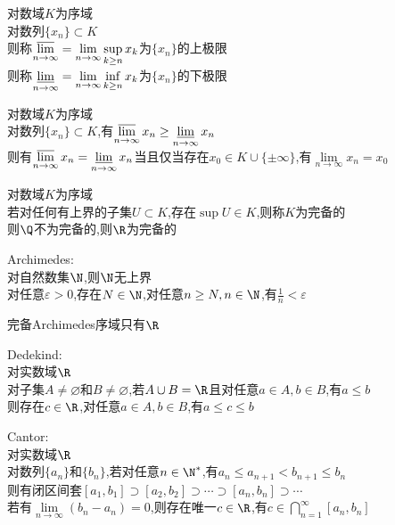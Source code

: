 \begin{dingyi}
对数域$K$为序域\\
对数列$\{x_n\}\subset K$\\
则称$\varlimsup\limits_{n\to\infty}=\lim\limits_{n\to\infty}\sup\limits_{k\geq n}x_k$为$\{x_n\}$的上极限\\
则称$\varliminf\limits_{n\to\infty}=\lim\limits_{n\to\infty}\inf\limits_{k\geq n}x_k$为$\{x_n\}$的下极限
\end{dingyi}

\begin{dingli}
对数域$K$为序域\\
对数列$\{x_n\}\subset K$,有$\varlimsup\limits_{n\to\infty} x_n\geq\varliminf\limits_{n\to\infty}x_n$\\
则有$\varlimsup\limits_{n\to\infty} x_n=\varliminf\limits_{n\to\infty}x_n$当且仅当存在$x_0\in K\cup\{\pm \infty\}$,有$\lim\limits_{n\to\infty}x_n=x_0$
\end{dingli}

\begin{dingyi}
对数域$K$为序域\\
若对任何有上界的子集$U\subset K$,存在$\sup U\in K$,则称$K$为完备的\\
则$\Q$不为完备的,则$\R$为完备的
\end{dingyi}

\begin{dingli}
Archimedes:\\
对自然数集$\N$,则$\N$无上界\\
对任意$\varepsilon>0$,存在$N\in\N$,对任意$n\geq N,n\in \N$,有$\frac{1}{n}<\varepsilon$
\end{dingli}

\begin{dingli}完备Archimedes序域只有$\R$
\end{dingli}

\begin{dingli}
Dedekind:\\
对实数域$\R$\\
对子集$A\neq\varnothing$和$B\neq \varnothing$,若$A\cup B=\R$且对任意$a\in A,b\in B$,有$a\leq b$\\
则存在$c\in\R$,对任意$a\in A,b\in B$,有$a\leq c\leq b$
\end{dingli}

\begin{dingli}
Cantor:\\
对实数域$\R$\\
对数列$\{a_n\}$和$\{b_n\}$,若对任意$n\in \N^*$,有$a_{n}\leq a_{n+1}<b_{n+1}\leq b_{n}$\\
则有闭区间套$[a_1,b_1]\supset[a_2,b_2]\supset\cdots\supset[a_n,b_n]\supset\cdots$\\
若有$\lim\limits_{n\to\infty}(b_n-a_n)=0$,则存在唯一$c\in \R$,有$c\in \bigcap\limits_{n=1}^{\infty}[a_n,b_n]$
\end{dingli}

